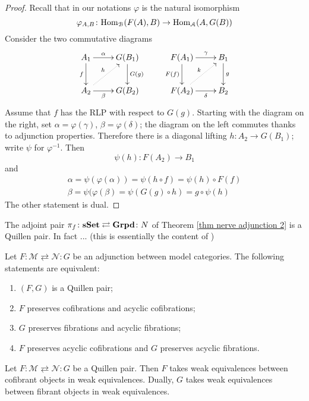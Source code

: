 \begin{refsection}
\begin{proof}
Recall that in our notations $\varphi$ is the natural isomorphism
\[
\varphi_{A,B} \colon \mathrm{Hom}_{\mathcal B}(F(A),B) \to \mathrm{Hom}_{\mathcal A}(A,G(B))
\]
Consider the two commutative diagrams
\[
\xymatrix{
A_1 \ar[d]_f \ar[r]^-\alpha & G(B_1) \ar[d]^{G(g)} \\ A_2 \ar[r]_-{\beta} \ar@{.>}[ur]^h & G(B_2)
} \qquad
\xymatrix{
F(A_1) \ar[d]_{F(f)} \ar[r]^-\gamma & B_1 \ar[d]^g \\ F(A_2) \ar@{.>}[ur]^k \ar[r]_-\delta & B_2
}
\]
Assume that $f$ has the RLP with respect to $G(g)$. Starting with the diagram on the right, set $\alpha = \varphi(\gamma)$, $\beta = \varphi(\delta)$; the diagram on the left commutes thanks to adjunction properties. Therefore there is a diagonal lifting $h \colon A_2 \to G(B_1)$; write $\psi$ for $\varphi^{-1}$. Then
\[
\psi(h) \colon F(A_2) \to B_1
\]
and
\begin{gather*}
\alpha = \psi(\varphi(\alpha)) = \psi(h \circ f) = \psi(h) \circ F(f) \\
\beta = \psi(\varphi(\beta) = \psi(G(g) \circ h) = g \circ \psi(h)
\end{gather*}
The other statement is dual.
\end{proof}

\begin{eg} \label{eg groupoids}
The adjoint pair $\pi_f \colon \mathbf{s\,\!\mathbf{Set}} \rightleftarrows \mathbf{Grpd} \colon N$ of Theorem \ref{thm nerve adjunction 2} is a Quillen pair. In fact ... (this is essentially the content of \cite[Lemma 3.3]{hollander})
\end{eg}

\begin{cor} \label{cor Quillen pair}
Let $F \colon \mathcal M \rightleftarrows \mathcal N \colon G$ be an adjunction between model categories. The following statements are equivalent:
\begin{enumerate}
\item $(F,G)$ is a Quillen pair;
\item $F$ preserves cofibrations and acyclic cofibrations;
\item $G$ preserves fibrations and acyclic fibrations;
\item $F$ preserves acyclic cofibrations and $G$ preserves acyclic fibrations.
\end{enumerate}
\end{cor}

\begin{cor}
Let $F \colon \mathcal M \rightleftarrows \mathcal N \colon G$ be a Quillen pair. Then $F$ takes weak equivalences between cofibrant objects in weak equivalences. Dually, $G$ takes weak equivalences between fibrant objects in weak equivalences.
\end{cor}


\end{refsection}
